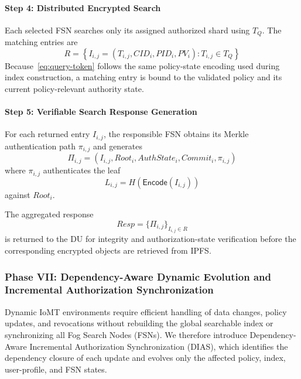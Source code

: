\documentclass{ieeetj}
\theoremstyle{ieee-style}
\begin{document}
\paragraph*{Step 4: Distributed Encrypted Search}

Each selected FSN searches only its assigned authorized shard using
$T_Q$. The matching entries are
\begin{equation}
R=
\left\{
I_{i,j}=
(T_{i,j},CID_i,PID_i,PV_i)
:
T_{i,j}\in T_Q
\right\}
\label{eq:search-results}
\end{equation}
Because~\eqref{eq:query-token} follows the same policy-state encoding
used during index construction, a matching entry is bound to the
validated policy and its current policy-relevant authority state.

\paragraph*{Step 5: Verifiable Search Response Generation}

For each returned entry $I_{i,j}$, the responsible FSN obtains its
Merkle authentication path $\pi_{i,j}$ and generates
\begin{equation}
\Pi_{i,j}
=
(I_{i,j},Root_i,AuthState_i,Commit_i,\pi_{i,j})
\label{eq:verification-bundle}
\end{equation}
where $\pi_{i,j}$ authenticates the leaf
\begin{equation}
L_{i,j}
=
H\!\left(
\mathsf{Encode}(I_{i,j})
\right)
\end{equation}
against $Root_i$.

The aggregated response
\begin{equation}
Resp=
\{\Pi_{i,j}\}_{I_{i,j}\in R}
\label{eq:search-response}
\end{equation}
is returned to the DU for integrity and authorization-state verification
before the corresponding encrypted objects are retrieved from IPFS.

\subsubsection*{\textbf{Phase VII: Dependency-Aware Dynamic Evolution
and Incremental Authorization Synchronization}}

Dynamic IoMT environments require efficient handling of data changes,
policy updates, and revocations without rebuilding the global searchable
index or synchronizing all Fog Search Nodes (FSNs). We therefore introduce
Dependency-Aware Incremental Authorization Synchronization (DIAS), which
identifies the dependency closure of each update and evolves only the
affected policy, index, user-profile, and FSN states.
\end{document}
